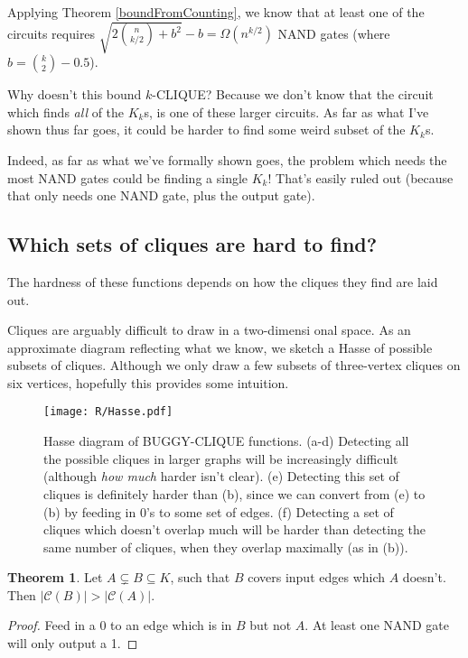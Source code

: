 \documentclass[12pt]{article}
\theoremstyle{definition}
\newtheorem{thm}{Theorem}[section]
\newcommand{\bigC}[0]{\mathcal{C}}
\begin{document}
Applying Theorem
\ref{boundFromCounting}, we know that at least one of the circuits requires
${\sqrt {2 {n \choose {k/2}} + b^2}} - b = \Omega(n^{k/2})$ 
NAND gates (where $b = {k \choose 2} - 0.5$).

Why doesn't this bound $k$-CLIQUE?
Because we don't know that the circuit which finds {\em all} of the
$K_k$s, is one of these larger circuits. As far as what I've
shown thus far goes, it could be harder to find some weird subset of the $K_k$s.

Indeed, as far as what we've formally shown goes, the problem which needs
the most NAND gates could be finding a single $K_k$! That's easily ruled out
(because that only needs one NAND gate, plus the output gate).

\subsection{Which sets of cliques are hard to find?}
\label{sec:whichCliques}

The hardness of these functions depends
on how the cliques they find are laid out.

Cliques are arguably difficult to draw in a two-dimensi onal space.
As an approximate diagram reflecting what we know,
we sketch a Hasse of possible subsets of cliques. Although
we only draw a few subsets of three-vertex cliques
on six vertices, hopefully this provides some
intuition.

\begin{figure}
\centering
\texttt{[image: R/Hasse.pdf]}
\caption{Hasse diagram of BUGGY-CLIQUE functions.
(a-d) 
Detecting all the possible cliques in larger graphs will be
increasingly difficult (although {\em how much} harder isn't clear).
(e) 
Detecting this set of cliques is definitely harder than (b),
since we can convert from (e) to (b) by feeding in 0's to
some set of edges.
(f) Detecting a set of cliques which doesn't overlap much will be
harder than detecting the same number of cliques, when they overlap
maximally (as in (b)).}
\label{fig:Hasse}
\end{figure}


\begin{thm}
\label{edgeZonking}
Let $A \subsetneq B \subseteq K$, such that $B$ covers input edges
which $A$ doesn't. Then $|\bigC(B)| > |\bigC(A)|$.
\end{thm}
\begin{proof}
Feed in a 0 to an edge which is in $B$ but not $A$. At least one
NAND gate will only output a 1.
\end{proof}
\end{document}
